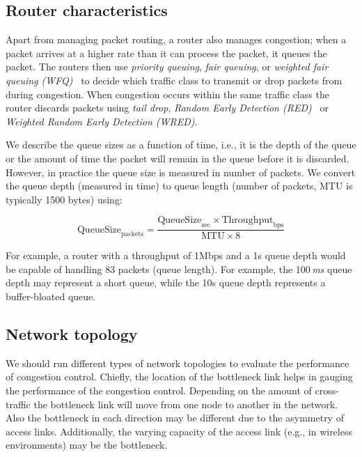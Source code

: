 \subsection{Router characteristics}


Apart from managing packet routing, a router also manages congestion; when a
packet arrives at a higher rate than it can process the packet, it queues the
packet. The routers then use \emph{priority queuing}, \emph{fair queuing}, or
\emph{weighted fair queuing (WFQ)}~\cite{rfc4594} to decide which traffic
class to transmit or drop packets from during congestion. When congestion
occurs within the same traffic class the router discards packets using
\emph{tail drop}, \emph{Random Early Detection (RED)}~\cite{Floyd:RED} or
\emph{Weighted Random Early Detection (WRED)}.

We describe the queue sizes as a function of time, i.e., it is the depth of
the queue or the amount of time the packet will remain in the queue before it
is discarded. However, in practice the queue size is measured in number of
packets. We convert the queue depth (measured in time) to queue length (number
of packets, MTU is typically 1500 bytes) using:

\begin{equation*}
  \mathrm{QueueSize}_\mathrm{packets} = 
    \frac{\mathrm{QueueSize}_\mathrm{sec} \times
    \mathrm{Throughput}_\mathrm{bps}}{\mathrm{MTU} \times \mathrm{8}}
\end{equation*}

For example, a router with a throughput of 1Mbps and a 1s queue depth would be
capable of handling 83 packets (queue length). For example, the 100\,\emph{ms}
queue depth may represent a short queue, while the 10s queue depth represents
a buffer-bloated queue.

\subsection{Network topology}

We should run different types of network topologies to evaluate the
performance of congestion control. Chiefly, the location of the bottleneck
link helps in gauging the performance of the congestion control. Depending on
the amount of cross-traffic the bottleneck link will move from one node to
another in the network. Also the bottleneck in each direction may be different
due to the asymmetry of access links. Additionally, the varying capacity of
the access link (e.g., in wireless environments) may be the bottleneck.



